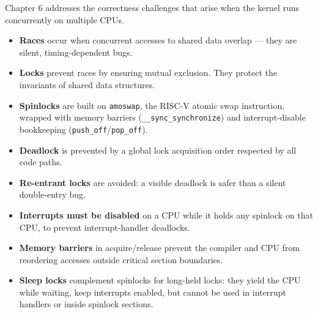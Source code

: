 \documentclass[11pt, a4paper]{article}
\begin{document}
\begin{tcolorbox}[summary, title={Chapter 6 --- Complete Summary}]
Chapter 6 addresses the correctness challenges that arise when the kernel runs concurrently on multiple CPUs.

\begin{itemize}[leftmargin=1.5em, itemsep=0.2em]
  \item \textbf{Races} occur when concurrent accesses to shared data overlap --- they are silent, timing-dependent bugs.
  \item \textbf{Locks} prevent races by ensuring mutual exclusion. They protect the invariants of shared data structures.
  \item \textbf{Spinlocks} are built on \lstinline|amoswap|, the RISC-V atomic swap instruction, wrapped with memory barriers (\lstinline|__sync_synchronize|) and interrupt-disable bookkeeping (\lstinline|push_off|/\lstinline|pop_off|).
  \item \textbf{Deadlock} is prevented by a global lock acquisition order respected by all code paths.
  \item \textbf{Re-entrant locks} are avoided: a visible deadlock is safer than a silent double-entry bug.
  \item \textbf{Interrupts must be disabled} on a CPU while it holds any spinlock on that CPU, to prevent interrupt-handler deadlocks.
  \item \textbf{Memory barriers} in acquire/release prevent the compiler and CPU from reordering accesses outside critical section boundaries.
  \item \textbf{Sleep locks} complement spinlocks for long-held locks: they yield the CPU while waiting, keep interrupts enabled, but cannot be used in interrupt handlers or inside spinlock sections.
\end{itemize}
\end{tcolorbox}
\end{document}
